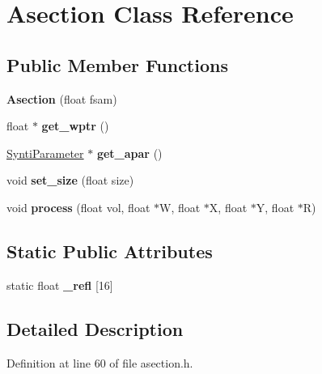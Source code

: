\hypertarget{class_asection}{}\section{Asection Class Reference}
\label{class_asection}
\subsection*{Public Member Functions}
\begin{DoxyCompactItemize}
\item 
\mbox{\label{class_asection_a7302b50a80058989d05aae4ff3745a3b}} 
{\bfseries Asection} (float fsam)
\item 
\mbox{\label{class_asection_ad042566c5aae380c7479939133781cf1}} 
float $\ast$ {\bfseries get\+\_\+wptr} ()
\item 
\mbox{\label{class_asection_af80c330ec8df4f63ca720ad7afbd4995}} 
\hyperlink{class_synti_parameter}{Synti\+Parameter} $\ast$ {\bfseries get\+\_\+apar} ()
\item 
\mbox{\label{class_asection_a343aa8b1533524f2a4d9b5bfa087c6d6}} 
void {\bfseries set\+\_\+size} (float size)
\item 
\mbox{\label{class_asection_a08e2f220e148af5faa32e3eae2d8e75c}} 
void {\bfseries process} (float vol, float $\ast$W, float $\ast$X, float $\ast$Y, float $\ast$R)
\end{DoxyCompactItemize}
\subsection*{Static Public Attributes}
\begin{DoxyCompactItemize}
\item 
static float {\bfseries \+\_\+refl} \mbox{[}16\mbox{]}
\end{DoxyCompactItemize}


\subsection{Detailed Description}


Definition at line 60 of file asection.\+h.



